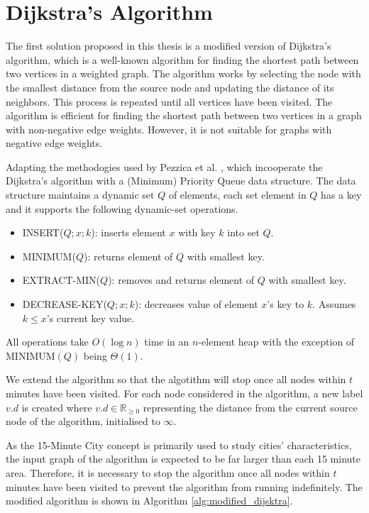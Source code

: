 \section{Dijkstra's Algorithm}

The first solution proposed in this thesis is a modified version of Dijkstra's algorithm, which is a well-known algorithm for finding the shortest path between two vertices in a weighted graph. The algorithm works by selecting the node with the smallest distance from the source node and updating the distance of its neighbors. This process is repeated until all vertices have been visited. The algorithm is efficient for finding the shortest path between two vertices in a graph with non-negative edge weights. However, it is not suitable for graphs with negative edge weights.

Adapting the methodogies used by Pezzica et al. \cite{cormen2022introduction}, which incooperate the Dijkstra's algorithm with a (Minimum) Priority Queue data structure. The data structure maintains a dynamic set $Q$ of elements, each set element in $Q$ has a key and it supports the following dynamic-set operations.

\begin{itemize}
    \item INSERT($Q; x; k$): inserts element $x$ with key $k$ into set $Q$.
    \item MINIMUM($Q$): returns element of $Q$ with smallest key.
    \item EXTRACT-MIN($Q$): removes and returns element of $Q$ with smallest key.
    \item DECREASE-KEY($Q;x;k$): decreases value of element $x$'s key to $k$. Assumes $k\leq x$'s current key value.
\end{itemize}

All operations take $O(\log n)$ time in an $n$-element heap with the exception of $\text{MINIMUM}(Q)$ being $\Theta(1)$.

We extend the algorithm so that the algotithm will stop once all nodes within $t$ minutes have been visited. For each node considered in the algorithm, a new label $v.d$ is created where $v.d \in \mathbb{R}_{\geq 0}$ representing the distance from the current source node of the algorithm, initialised to $\infty$.

As the 15-Minute City concept is primarily used to study cities' characteristics, the input graph of the algorithm is expected to be far larger than each 15 minute area. Therefore, it is necessary to stop the algorithm once all nodes within $t$ minutes have been visited to prevent the algorithm from running indefinitely. The modified algorithm is shown in Algorithm \ref{alg:modified_dijsktra}.

